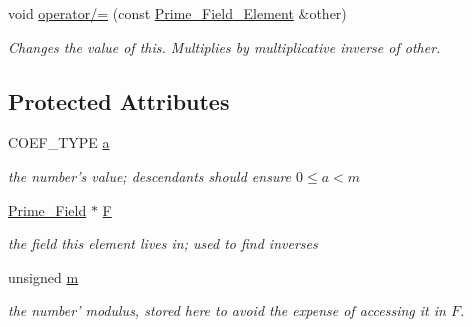 \begin{Indent}
\begin{DoxyCompactItemize}
\mbox{\label{class_prime___field___element_a73d679e6a6f2f55ac8f2873cfb11f91b}} 
void \hyperlink{class_prime___field___element_a73d679e6a6f2f55ac8f2873cfb11f91b}{operator/=} (const \hyperlink{class_prime___field___element}{Prime\+\_\+\+Field\+\_\+\+Element} \&other)
\begin{DoxyCompactList}\small\item\em Changes the value of {\ttfamily this}. Multiplies by multiplicative inverse of {\ttfamily other}. \end{DoxyCompactList}\end{DoxyCompactItemize}
\end{Indent}
\subsection*{Protected Attributes}
\begin{DoxyCompactItemize}
\item 
\mbox{\label{class_prime___field___element_a0d7ddb9f8693a8b06c49157632384771}} 
C\+O\+E\+F\+\_\+\+T\+Y\+PE \hyperlink{class_prime___field___element_a0d7ddb9f8693a8b06c49157632384771}{a}
\begin{DoxyCompactList}\small\item\em the number's value; descendants should ensure $0\leq a<m$ \end{DoxyCompactList}\item 
\mbox{\label{class_prime___field___element_ac727e179ad217f1672e7011e87fe4b51}} 
\hyperlink{class_prime___field}{Prime\+\_\+\+Field} $\ast$ \hyperlink{class_prime___field___element_ac727e179ad217f1672e7011e87fe4b51}{F}
\begin{DoxyCompactList}\small\item\em the field this element lives in; used to find inverses \end{DoxyCompactList}\item 
\mbox{\label{class_prime___field___element_a0aa08b53ecfdda7a777155758e6b0edc}} 
unsigned \hyperlink{class_prime___field___element_a0aa08b53ecfdda7a777155758e6b0edc}{m}
\begin{DoxyCompactList}\small\item\em the number' modulus, stored here to avoid the expense of accessing it in $F$. \end{DoxyCompactList}\end{DoxyCompactItemize}
